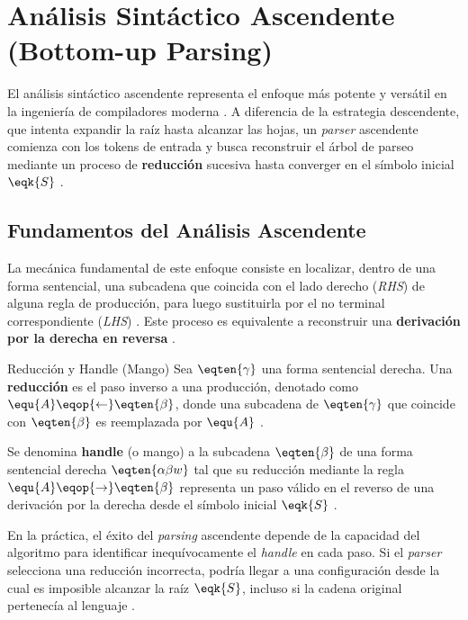 \section{Análisis Sintáctico Ascendente (Bottom-up Parsing)}
\label{sec:3_6_bottom_up}

El análisis sintáctico ascendente representa el enfoque más potente y versátil en la ingeniería de compiladores moderna \cite{aho2006compilers}. A diferencia de la estrategia descendente, que intenta expandir la raíz hasta alcanzar las hojas, un \textit{parser} ascendente comienza con los tokens de entrada y busca reconstruir el árbol de parseo mediante un proceso de \textbf{reducción} sucesiva hasta converger en el símbolo inicial $\eqk{S}$ \cite{aho2006compilers}.

\subsection{Fundamentos del Análisis Ascendente}
\label{subsec:3_6_1_fundamentos_ascendente}

La mecánica fundamental de este enfoque consiste en localizar, dentro de una forma sentencial, una subcadena que coincida con el lado derecho (\textit{RHS}) de alguna regla de producción, para luego sustituirla por el no terminal correspondiente (\textit{LHS}) \cite{aho2006compilers}. Este proceso es equivalente a reconstruir una \textbf{derivación por la derecha en reversa} \cite{aho2006compilers,sipser2012introduction}.

\begin{definicion}{Reducción y Handle (Mango)}
Sea $\eqten{\gamma}$ una forma sentencial derecha. Una \textbf{reducción} es el paso inverso a una producción, denotado como $\equ{A} \eqop{\leftarrow} \eqten{\beta}$, donde una subcadena de $\eqten{\gamma}$ que coincide con $\eqten{\beta}$ es reemplazada por $\equ{A}$ \cite{sipser2012introduction,aho2006compilers}. 

Se denomina \textbf{handle} (o mango) a la subcadena $\eqten{\beta}$ de una forma sentencial derecha $\eqten{\alpha\beta w}$ tal que su reducción mediante la regla $\equ{A} \eqop{\rightarrow} \eqten{\beta}$ representa un paso válido en el reverso de una derivación por la derecha desde el símbolo inicial $\eqk{S}$ \cite{sipser2012introduction}.
\end{definicion}

En la práctica, el éxito del \textit{parsing} ascendente depende de la capacidad del algoritmo para identificar inequívocamente el \textit{handle} en cada paso. Si el \textit{parser} selecciona una reducción incorrecta, podría llegar a una configuración desde la cual es imposible alcanzar la raíz $\eqk{S}$, incluso si la cadena original pertenecía al lenguaje \cite{sipser2012introduction,aho2006compilers}.

